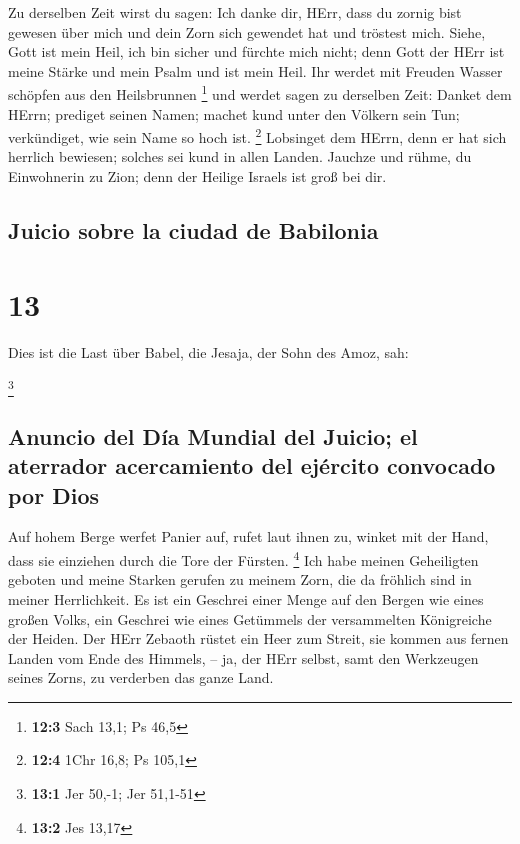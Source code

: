  Zu derselben Zeit wirst du sagen: Ich danke dir, HErr,
dass du zornig bist gewesen über mich und dein Zorn sich gewendet hat
und tröstest mich.  Siehe, Gott ist mein Heil, ich bin
sicher und fürchte mich nicht; denn Gott der HErr ist meine Stärke und
mein Psalm und ist mein Heil.  Ihr werdet mit Freuden
Wasser schöpfen aus den Heilsbrunnen \footnote{\textbf{12:3} Sach 13,1;
  Ps 46,5}  und werdet sagen zu derselben Zeit: Danket dem
HErrn; prediget seinen Namen; machet kund unter den Völkern sein Tun;
verkündiget, wie sein Name so hoch ist. \footnote{\textbf{12:4} 1Chr
  16,8; Ps 105,1}  Lobsinget dem HErrn, denn er hat sich
herrlich bewiesen; solches sei kund in allen Landen. 
Jauchze und rühme, du Einwohnerin zu Zion; denn der Heilige Israels ist
groß bei dir.

\hypertarget{juicio-sobre-la-ciudad-de-babilonia}{%
\subsection{Juicio sobre la ciudad de
Babilonia}\label{juicio-sobre-la-ciudad-de-babilonia}}

\hypertarget{section-12}{%
\section{13}\label{section-12}}

 Dies ist die Last über Babel, die Jesaja, der Sohn des
Amoz, sah:

\footnote{\textbf{13:1} Jer 50,-1; Jer 51,1-51}

\hypertarget{anuncio-del-duxeda-mundial-del-juicio-el-aterrador-acercamiento-del-ejuxe9rcito-convocado-por-dios}{%
\subsection{Anuncio del Día Mundial del Juicio; el aterrador
acercamiento del ejército convocado por
Dios}\label{anuncio-del-duxeda-mundial-del-juicio-el-aterrador-acercamiento-del-ejuxe9rcito-convocado-por-dios}}

 Auf hohem Berge werfet Panier auf, rufet laut ihnen zu,
winket mit der Hand, dass sie einziehen durch die Tore der Fürsten.
\footnote{\textbf{13:2} Jes 13,17}  Ich habe meinen
Geheiligten geboten und meine Starken gerufen zu meinem Zorn, die da
fröhlich sind in meiner Herrlichkeit.  Es ist ein Geschrei
einer Menge auf den Bergen wie eines großen Volks, ein Geschrei wie
eines Getümmels der versammelten Königreiche der Heiden. Der HErr
Zebaoth rüstet ein Heer zum Streit,  sie kommen aus fernen
Landen vom Ende des Himmels, -- ja, der HErr selbst, samt den Werkzeugen
seines Zorns, zu verderben das ganze Land.

